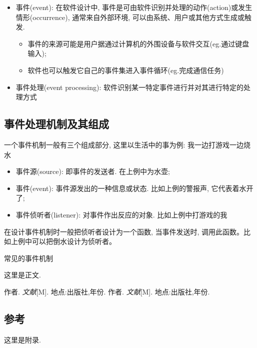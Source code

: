 \documentclass[12pt, a4paper, oneside]{ctexart}
\begin{document}
\begin{itemize}
    \item 事件(event): 在软件设计中, 事件是可由软件识别并处理的动作(action)或发生情形(occurrence), 通常来自外部环境, 可以由系统、用户或其他方式生成或触发. 
    \begin{itemize}
        \item 事件的来源可能是用户据通过计算机的外围设备与软件交互(eg.通过键盘输入); 
        \item 软件也可以触发它自己的事件集进入事件循环(eg.完成通信任务)
    \end{itemize}
    \item 事件处理(event processing): 软件识别某一特定事件进行并对其进行特定的处理方式
\end{itemize}

\subsection{事件处理机制及其组成}
一个事件机制一般有三个组成部分, 这里以生活中的事为例: 我一边打游戏一边烧水
\begin{itemize}
    \item 事件源(source): 即事件的发送者. 在上例中为水壶; 
    \item 事件(event): 事件源发出的一种信息或状态. 比如上例的警报声, 它代表着水开了; 
    \item 事件侦听者(listener): 对事件作出反应的对象. 比如上例中打游戏的我
\end{itemize}
在设计事件机制时一般把侦听者设计为一个函数, 当事件发送时, 调用此函数。比如上例中可以把倒水设计为侦听者。

常见的事件机制

这里是正文. 

\newpage

\begin{thebibliography}{99}
    作者. \emph{文献}[M]. 地点:出版社,年份.
    作者. \emph{文献}[M]. 地点:出版社,年份.
\end{thebibliography}

\newpage

\begin{appendices}
    \renewcommand{\thesection}{\Alph{section}}
    \section{参考}
        这里是附录. 
\end{appendices}
\end{document}
